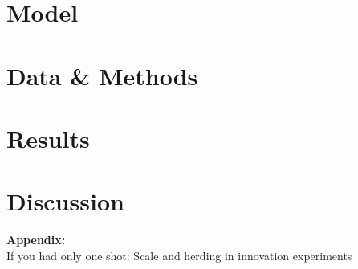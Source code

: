 \documentclass[12pt,letterpaper]{article}
\begin{document}
\section{Model}\label{sec:model}


\section{Data \& Methods}


\section{Results}\label{sec:results}



\section{Discussion}


\clearpage 

\footnotesize
\singlespacing




\processdelayedfloats %

\clearpage
\normalsize
\doublespacing

\vspace*{2cm}

\begin{center}
    \textbf{\Large Appendix:} 
    \\
    \Large If you had only one shot: Scale and herding in innovation experiments
\end{center}

\clearpage

\renewcommand{\thesection}{\Alph{section}}

\appendix

\renewcommand{\thesection}{\Alph{section}}


\clearpage

\clearpage

\clearpage

\clearpage

\clearpage
\end{document}
